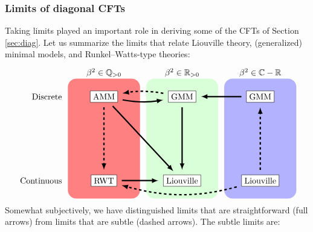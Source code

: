 \documentclass[12pt, a4paper]{article}
\theoremstyle{break}
\begin{document}
\subsubsection{Limits of diagonal CFTs}

Taking limits played an important role in deriving some of the CFTs of Section \ref{sec:diag}. 
Let us summarize the limits that relate Liouville theory, (generalized) minimal models, and Runkel--Watts-type theories: 
\begin{align}
\begin{tikzpicture}[scale = .25, baseline=(current  bounding  box.center)]
\fill[red!50, rounded corners = 10] (-6, -10) rectangle (6, 10);
\fill[green!15, rounded corners = 10] (7, -10) rectangle (19, 10);
\fill[blue!30, rounded corners = 10] (20, -10) rectangle (32, 10);
\node at (0, 11) {$\beta^2\in\mathbb{Q}_{>0}$};
\node at (13, 11) {$\beta^2\in\mathbb{R}_{>0}$};
\node at (26, 11) {$\beta^2\in \mathbb{C}-\mathbb{R}$};
\node[left] at (-6.5, 7) {Discrete};
\node[left] at (-6.5, -7) {Continuous};
\draw (0, 7) node[draw, fill = white] (mm) {AMM};
\draw (13, 7) node[draw, fill = white] (gmm1) {GMM};
\draw (26, 7) node[draw, fill = white] (gmm2) {GMM};
\draw (0, -7) node[draw, fill = white] (rwt) {RWT};
\draw (13, -7) node[draw, fill = white] (clo) {Liouville};
\draw (26, -7) node[draw, fill = white] (liou) {Liouville};
\draw [ultra thick, shorten <= 2mm, shorten >= 2mm, -latex, 
       out = -10, in = -170] (mm) to (gmm1);
\draw [ultra thick, shorten <= 2mm, shorten >= 2mm, -latex, dashed,
       out = 170, in = 10] (gmm1) to (mm);
\draw [ultra thick, shorten <= 2mm, shorten >= 2mm, -latex] (gmm2) to (gmm1);
\draw [ultra thick, shorten <= 2mm, shorten >= 2mm, -latex] (mm) to (clo);
\draw [ultra thick, shorten <= 2mm, shorten >= 2mm, -latex, dashed] (mm) to (rwt);
\draw [ultra thick, shorten <= 2mm, shorten >= 2mm, -latex] (rwt) to (clo);
\draw [ultra thick, shorten <= 2mm, shorten >= 2mm, -latex] (gmm1) to (clo);
\draw [ultra thick, shorten <= 2mm, shorten >= 2mm, -latex,
       out = -165, in = -15, dashed] (liou) to (rwt);
\draw [ultra thick, shorten <= 2mm, shorten >= 2mm, -latex, dashed] (liou) to (gmm2);
\end{tikzpicture}
\label{lims}
\end{align}
Somewhat subjectively, we have distinguished limits that are straightforward (full arrows) from limits that are subtle (dashed arrows). The subtle limits are:
\end{document}
